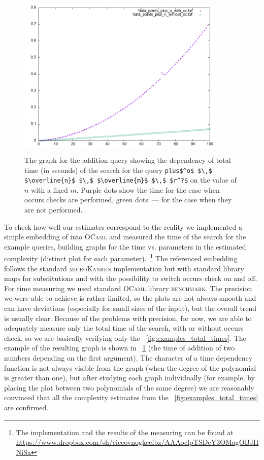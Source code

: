 \begin{figure}[t]
    \includegraphics[width=10cm,height=8cm]{plot_example}
  \caption{The graph for the addition query showing the dependency of total time (in seconds) of the search for the query \lstinline|plus$^o$ $\,$ $\overline{n}$ $\,$ $\overline{m}$ $\,$ $r^?$| on the value of $n$ with a fixed $m$. Purple dots show the time for the case when occurs checks are performed, green dots~--- for the case when they are not performed. }
  \label{fig:plot_example}
\end{figure}

To check how well our estimates correspond to the reality we implemented a simple embedding of \mK into \textsc{OCaml} and measured the time of the search for the example queries,
building graphs for the time vs. parameters in the estimated complexity (distinct plot for each parameter).~\footnote{The implementation and the results of the measuring can be found at \url{https://www.dropbox.com/sh/ciceovnogkeeibz/AAAoclpTSDeY3OMagOBJHNiSa}} The referenced embedding follows the standard \textsc{microKanren} implementation but with standard library maps for substitutions and with the possibility to switch occurs check on and off.
For time measuring we used standard \textsc{OCaml} library \textsc{benchmark}. The precision we were able to achieve is rather limited, so the plots are not always smooth and can have
deviations (especially for small sizes of the input), but the overall trend is usually clear. Because of the problems with precision, for now, we are able to adequately measure only the total
time of the search, with or without occurs check, so we are basically verifying only the \figureword~\ref{fig:examples_total_times}. 
The example of the resulting graph is shown in \figureword~\ref{fig:plot_example} (the time of addition of two numbers depending on the first argument). The character of a time dependency function
is not always visible from the graph (when the degree of the polynomial is greater than one), but after studying each graph individually (for example, by placing the plot between two polynomials of the same degree) we are reasonably convinced that all the complexity estimates from the \figureword~\ref{fig:examples_total_times} are confirmed.

